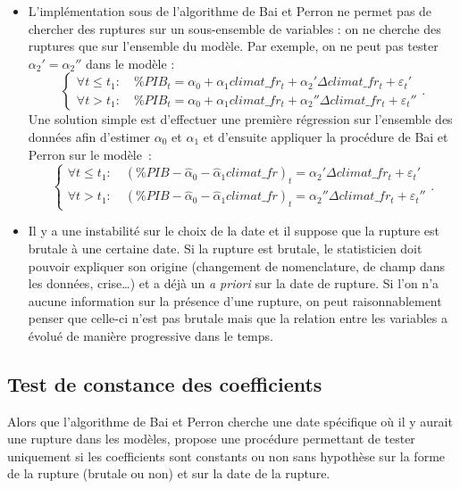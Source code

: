 \documentclass[
  a4paper,
  DIV=11,
  numbers=noendperiod,
  french]{scrartcl}
\newcommand\1{{\mathds 1}}
\theoremstyle{remark}
\begin{document}
\begin{itemize}
\item
  L'implémentation sous  de l'algorithme de Bai et
  Perron ne permet pas de chercher des ruptures sur un sous-ensemble de
  variables : on ne cherche des ruptures que sur l'ensemble du modèle.
  Par exemple, on ne peut pas tester \(\alpha_2' = \alpha_2''\) dans le
  modèle : \[
  \begin{cases}
  \forall t \leq t_1 :\quad \% PIB_t = \alpha_0 + \alpha_1 climat\_fr_t + \alpha_2' \Delta climat\_fr_t + \varepsilon_t' \\
  \forall t > t_1 :\quad \% PIB_t = \alpha_0 + \alpha_1 climat\_fr_t + \alpha_2'' \Delta climat\_fr_t + \varepsilon_t''
  \end{cases}.
  \] Une solution simple est d'effectuer une première régression sur
  l'ensemble des données afin d'estimer \(\alpha_0\) et \(\alpha_1\) et
  d'ensuite appliquer la procédure de Bai et Perron sur le modèle~: \[
  \begin{cases}
  \forall t \leq t_1 :\quad (\% PIB - \hat\alpha_0-\hat \alpha_1 climat\_fr)_t = \alpha_2' \Delta climat\_fr_t + \varepsilon_t' \\
  \forall t > t_1 :\quad (\% PIB - \hat\alpha_0-\hat \alpha_1 climat\_fr)_t = \alpha_2'' \Delta climat\_fr_t + \varepsilon_t''
  \end{cases}.
  \]
\item
  Il y a une instabilité sur le choix de la date et il suppose que la
  rupture est brutale à une certaine date. Si la rupture est brutale, le
  statisticien doit pouvoir expliquer son origine (changement de
  nomenclature, de champ dans les données, crise\ldots) et a déjà un
  \emph{a priori} sur la date de rupture. Si l'on n'a aucune information
  sur la présence d'une rupture, on peut raisonnablement penser que
  celle-ci n'est pas brutale mais que la relation entre les variables a
  évolué de manière progressive dans le temps.
\end{itemize}

\subsection{Test de constance des coefficients}\label{sec-hansen-test}

Alors que l'algorithme de Bai et Perron cherche une date spécifique où
il y aurait une rupture dans les modèles, \textcite{hansen1992testing}
propose une procédure permettant de tester uniquement si les
coefficients sont constants ou non sans hypothèse sur la forme de la
rupture (brutale ou non) et sur la date de la rupture.
\end{document}

